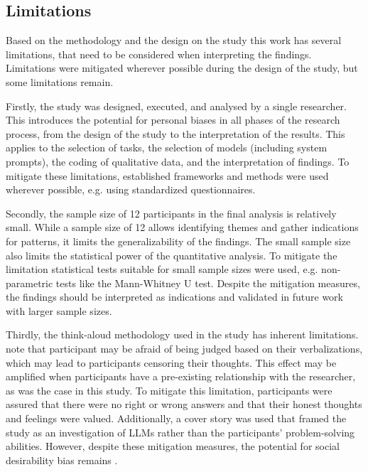 \subsection{Limitations} \label{ssec:limitations}

Based on the methodology and the design on the study this work has several limitations, that need to be considered when interpreting the findings. Limitations were mitigated wherever possible during the design of the study, but some limitations remain.

Firstly, the study was designed, executed, and analysed by a single researcher. This introduces the potential for personal biases in all phases of the research process, from the design of the study to the interpretation of the results. This applies to the selection of tasks, the selection of models (including system prompts), the coding of qualitative data, and the interpretation of findings. To mitigate these limitations, established frameworks and methods were used wherever possible, e.g. using standardized questionnaires.

Secondly, the sample size of 12 participants in the final analysis is relatively small. While a sample size of 12 allows identifying themes and gather indications for patterns, it limits the generalizability of the findings. The small sample size also limits the statistical power of the quantitative analysis. To mitigate the limitation statistical tests suitable for small sample sizes were used, e.g. non-parametric tests like the Mann-Whitney U test. Despite the mitigation measures, the findings should be interpreted as indications and validated in future work with larger sample sizes.

Thirdly, the think-aloud methodology used in the study has inherent limitations. \textcite{VanSomeren1994} note that participant may be afraid of being judged based on their verbalizations, which may lead to participants censoring their thoughts. This effect may be amplified when participants have a pre-existing relationship with the researcher, as was the case in this study. To mitigate this limitation, participants were assured that there were no right or wrong answers and that their honest thoughts and feelings were valued. Additionally, a cover story was used that framed the study as an investigation of \acp{LLM} rather than the participants' problem-solving abilities. However, despite these mitigation measures, the potential for social desirability bias remains \parencite{Krumpal2013}.

